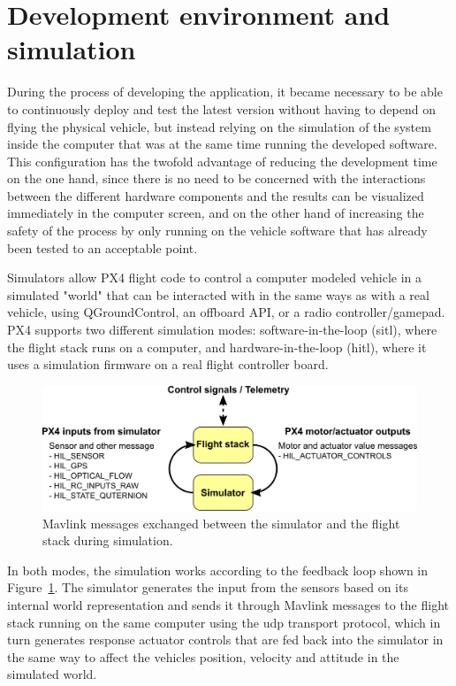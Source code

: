 \section{Development environment and simulation}
\label{sec:devenv}
During the process of developing the application, it became necessary to be able to continuously deploy and test the latest version without having to depend on flying the physical vehicle, but instead relying on the simulation of the system inside the computer that was at the same time running the developed software.
This configuration has the twofold advantage of reducing the development time on the one hand, since there is no need to be concerned with the interactions between the different hardware components and the results can be visualized immediately in the computer screen, and on the other hand of increasing the safety of the process by only running on the vehicle software that has already been tested to an acceptable point.

Simulators allow PX4 flight code to control a computer modeled vehicle in a simulated "world" that can be interacted with in the same ways as with a real vehicle, using QGroundControl, an offboard API, or a radio controller/gamepad. PX4 supports two different simulation modes: software-in-the-loop (\gls{sitl}), where the flight stack runs on a computer, and hardware-in-the-loop (\gls{hitl}), where it uses a simulation firmware on a real flight controller board.
\begin{figure}
  \centering
  \includegraphics[width=\textwidth,keepaspectratio]{img/px4_simulator_messages.png}
  \caption{Mavlink messages exchanged between the simulator and the flight stack during simulation.}\label{fig:simulator-msgs}
\end{figure}
In both modes, the simulation works according to the feedback loop shown in Figure~\ref{fig:simulator-msgs}. 
The simulator generates the input from the sensors based on its internal world representation and sends it through Mavlink messages to the flight stack running on the same computer using the \gls{udp} transport protocol, which in turn generates response actuator controls that are fed back into the simulator in the same way to affect the vehicles position, velocity and attitude in the simulated world.

